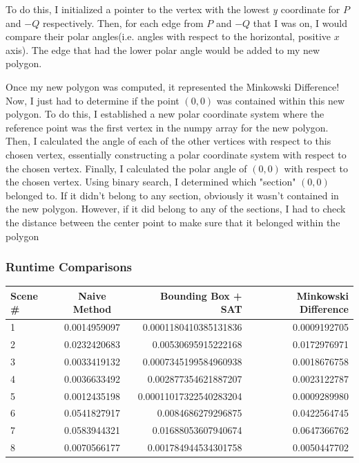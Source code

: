 \documentclass{article}
\begin{document}
To do this, I initialized a pointer to the vertex with the lowest $y$ coordinate for $P$ and $-Q$ respectively. Then, for each edge from $P$ and $-Q$ that I was on, I would compare their polar angles(i.e. angles with respect to the horizontal, positive $x$ axis). The edge that had the lower polar angle would be added to my new polygon. \newline 

Once my new polygon was computed, it represented the Minkowski Difference! Now, I just had to determine if the point $(0,0)$ was contained within this new polygon. To do this, I established a new polar coordinate system where the reference point was the first vertex in the numpy array for the new polygon. Then, I calculated the angle of each of the other vertices with respect to this chosen vertex, essentially constructing a polar coordinate system with respect to the chosen vertex. Finally, I calculated the polar angle of $(0,0)$ with respect to the chosen vertex. Using binary search, I determined which "section" $(0,0)$ belonged to. If it didn't belong to any section, obviously it wasn't contained in the new polygon. However, if it did belong to any of the sections, I had to check the distance between the center point to make sure that it belonged within the polygon

\subsubsection{Runtime Comparisons}

\begin{tabular}{|l|c|r|r|}
  \hline
  Scene \# & Naive Method & Bounding Box + SAT & Minkowski Difference \\
  \hline
  1 & 0.0014959097 & 0.0001180410385131836 & 0.0009192705 \\
2 & 0.0232420683 & 0.00530695915222168 & 0.0172976971 \\
3 & 0.0033419132 & 0.0007345199584960938 & 0.0018676758 \\
4 & 0.0036633492 & 0.002877354621887207 & 0.0023122787 \\
5 & 0.0012435198 & 0.00011017322540283204 & 0.0009289980 \\
6 & 0.0541827917 & 0.0084686279296875 & 0.0422564745 \\
7 & 0.0583944321 & 0.01688053607940674 & 0.0647366762 \\
8 & 0.0070566177 & 0.001784944534301758 & 0.0050447702 \\
  \hline
\end{tabular} \newline 
\end{document}
